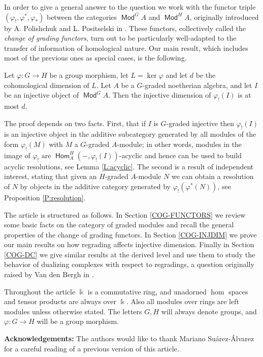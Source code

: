 \documentclass[11pt,fleqn]{article}
\renewcommand\to{\longrightarrow}
\renewcommand\phi{\varphi}
\renewcommand\k{\Bbbk}
\DeclareMathOperator\Mod{\mathsf{Mod}}
\DeclareMathOperator\Hom{\mathsf{Hom}}
\begin{document}
In order to give a general answer to the question we work with the functor 
triple $(\phi_!, \phi^*, \phi_*)$ between the categories $\Mod^G A$ and 
$\Mod^H A$, originally introduced by A. Polishchuk and L. Positselski in 
\cite{PP-secondHH}. These functors, collectively called the \emph{change of 
grading functors}, turn out to be particularly well-adapted to the transfer of 
information of homological nature. Our main result, which includes most of the 
previous ones as special cases, is the following.
\begin{Theorem*}
Let $\phi: G \to H$ be a group morphism, let $L = \ker \phi$ and let $d$ be 
the cohomological dimension of $L$. Let $A$ be a $G$-graded noetherian 
algebra, and let $I$ be an injective object of $\Mod^G A$. Then the injective
dimension of $\phi_!(I)$ is at most $d$. 
\end{Theorem*}
The proof depends on two facts. First, that if $I$ is 
$G$-graded injective then $\phi_!(I)$ is an injective object in the additive 
subcategory generated by all modules of the form $\phi_!(M)$ with $M$ a 
$G$-graded $A$-module; in other words, modules in the image of $\phi_!$ are 
$\Hom_A^H(-,\phi_!(I))$-acyclic and hence can be used to build acyclic 
resolutions, see Lemma \ref{L:acyclic}. The second is a result of independent 
interest, stating that given an $H$-graded $A$-module $N$ we can obtain a 
resolution of $N$ by objects in the additive category generated by 
$\phi_!(\phi^*(N))$, see Proposition \ref{P:resolution}.  

\bigskip
The article is structured as follows. In Section \ref{COG-FUNCTORS} we review 
some basic facts on the category of graded modules and recall the general 
properties of the change of grading functors. In Section \ref{COG-INJDIM} we 
prove our main results on how regrading affects injective dimension. Finally 
in Section \ref{COG-DC} we give similar results at the derived level and use 
them to  study the behavior of dualizing complexes with respect to regradings,
a question originally raised by Van den Bergh in \cite{VdB-existence-dc}.

\bigskip
Throughout the article $\k$ is a commutative ring, and unadorned $\hom$ 
spaces and tensor products are always over $\k$. Also all modules over rings
are left modules unless otherwise stated. The letters $G, H$ will always denote
groups, and $\phi: G \to H$ will be a group morphism.

\bigskip
\textbf{Acknowledgements:} The authors would like to thank Mariano 
Suárez-Álvarez for a careful reading of a previous version of this article.
\end{document}
